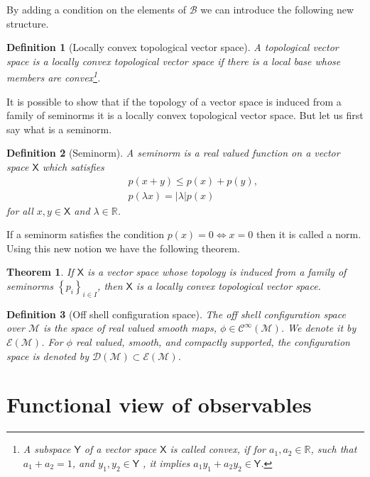 \documentclass[10pt]{book}
\newcommand{\abs}[1]{\left|#1\right|}
\newcommand{\Bcal}{\mathcal{B}}
\newcommand{\Ccal}{\mathcal{C}}
\newcommand{\Dcal}{\mathcal{D}}
\newcommand{\Ecal}{\mathcal{E}}
\newcommand{\Mcal}{\mathcal{M}}
\newcommand{\Rbb}{\mathbb{R}}
\newcommand{\Xsf}{\mathsf{X}}
\newcommand{\Ysf}{\mathsf{Y}}
\theoremstyle{break}
\newtheorem{theorem}{Theorem}
\newtheorem{definition}{Definition}
\begin{document}
By adding a condition on the elements of $\Bcal$ we can introduce the following new structure.

\begin{definition}[Locally convex topological vector space]
A topological vector space is a locally convex topological vector space if there is a local base whose members are convex\footnote{A subspace $\Ysf$ of a vector space $\Xsf$ is called convex, if for $a_1, a_2 \in \Rbb$, such that $a_1 + a_2 = 1$, and $y_1, y_2 \in \Ysf$ , it implies $a_1 y_1 + a_2 y_2 \in \Ysf$.}.
\end{definition}


It is possible to show that if the topology of a vector space is induced from a family of seminorms it is a locally convex topological vector space. But let us first say what is a seminorm.


\begin{definition}[Seminorm]
A seminorm is a real valued function on a vector space $\Xsf$ which satisfies 
%
\begin{eqnarray*}
&& p(x+y) \leq p(x) + p(y) , \\
&& p(\lambda x) = \abs{\lambda} p(x)
\end{eqnarray*}
%
for all $x,y \in \Xsf$ and $\lambda \in \Rbb$.
\end{definition}


If a seminorm satisfies the condition $p(x)=0 \Leftrightarrow x=0$ then it is called a norm. Using this new notion we have the following theorem.


\begin{theorem}
If $\Xsf$ is a vector space whose topology is induced from a family of seminorms $\left\{ p_i  \right\}_{i\in I}$, then $\Xsf$ is a locally convex topological vector space.
\end{theorem}




\begin{definition}[Off shell configuration space]
The off shell configuration space over $\Mcal$ is the space of real valued smooth maps, $\phi \in \Ccal^\infty(\Mcal)$. We denote it by $\Ecal(\Mcal)$. For $\phi$ real valued, smooth, and compactly supported, the configuration space is denoted by $\Dcal(\Mcal) \subset \Ecal(\Mcal)$. 
\end{definition}


\section{Functional view of observables}
\end{document}
